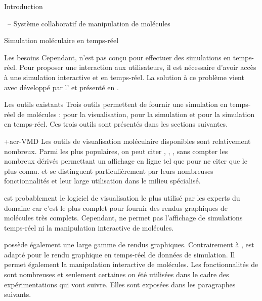 \documentclass[myfrancais]{mythesis}
\begin{document}
\begin{mypart}{Introduction}
\begin{mychapter}{\myShaddock\ -- Système collaboratif de manipulation de molécules}
\begin{mysection}{Simulation moléculaire en temps-réel}
\begin{mysubsection}{Les besoins}
					Cependant,  n'est pas conçu pour effectuer des simulations en temps-réel.
					Pour proposer une interaction aux utilisateurs, il est nécessaire d'avoir accès à une simulation interactive et en temps-réel.
					La solution à ce problème vient avec  développé par l' et présenté en .
				\end{mysubsection}
				\begin{mysubsection}{Les outils existants}
					Trois outils permettent de fournir une simulation en temps-réel de molécules :  pour la visualisation,  pour la simulation et  pour la simulation en temps-réel.
					Ces trois outils sont présentés dans les sections suivantes.
					\begin{mysubsubsection}{\myacronl+{acr-VMD}}
						Les outils de visualisation moléculaire disponibles sont relativement nombreux.
						Parmi les plus populaires, on peut citer \myPyMOL {},  , \myChimera {}, \myRasmol {} sans compter les nombreux dérivés permettant un affichage en ligne tel que \myJmol {} pour ne citer que le plus connu.
						\myPyMOL et  se distinguent particulièrement par leurs nombreuses fonctionnalités et leur large utilisation dans le milieu spécialisé.

						\myPyMOL est probablement le logiciel de visualisation le plus utilisé par les experts du domaine car c'est le plus complet pour fournir des rendus graphiques de molécules très complets.
						Cependant, \myPyMOL ne permet pas l'affichage de simulations temps-réel ni la manipulation interactive de molécules.

						 possède également une large gamme de rendus graphiques.
						Contrairement à \myPyMOL,  est adapté pour le rendu graphique en temps-réel de données de simulation.
						Il permet également la manipulation interactive de molécules.
						Les fonctionnalités de  sont nombreuses et seulement certaines on été utilisées dans le cadre des expérimentations qui vont suivre.
						Elles sont exposées dans les paragraphes suivants.


\end{mysubsubsection}
\end{mysubsection}
\end{mysection}
\end{mychapter}
\end{mypart}
\end{document}
